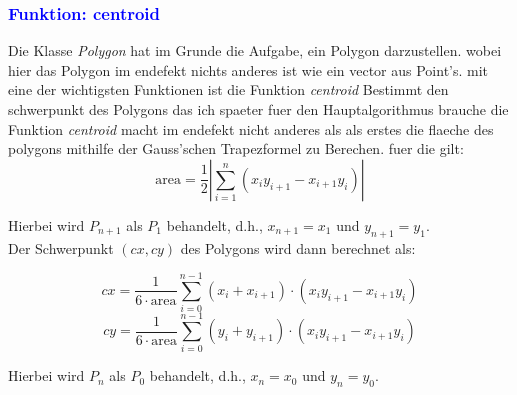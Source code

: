 \documentclass{article}
\begin{document}
\subsubsection{\textcolor{blue}{Funktion: centroid}}
\begin{center}
Die Klasse \textit{Polygon} hat im Grunde die Aufgabe, ein Polygon darzustellen. wobei hier das Polygon im endefekt nichts anderes ist wie ein vector aus Point's. mit eine der wichtigsten Funktionen ist die Funktion \textit{centroid} Bestimmt den schwerpunkt des Polygons das ich spaeter fuer den Hauptalgorithmus brauche die Funktion \textit{centroid} macht im endefekt nicht anderes als als erstes die flaeche des polygons mithilfe der Gauss'schen Trapezformel zu Berechen. fuer die gilt:
\[
\text{area} = \frac{1}{2} \left| \sum_{i=1}^{n} (x_i y_{i+1} - x_{i+1} y_i) \right|
\]

Hierbei wird $P_{n+1}$ als $P_1$ behandelt, d.h., $x_{n+1} = x_1$ und $y_{n+1} = y_1$.
\\
Der Schwerpunkt $(cx, cy)$ des Polygons wird dann berechnet als:

\[
cx = \frac{1}{6 \cdot \text{area}} \sum_{i=0}^{n-1} (x_i + x_{i+1}) \cdot (x_i y_{i+1} - x_{i+1} y_i)
\]
\[
cy = \frac{1}{6 \cdot \text{area}} \sum_{i=0}^{n-1} (y_i + y_{i+1}) \cdot (x_i y_{i+1} - x_{i+1} y_i)
\]

Hierbei wird $P_{n}$ als $P_0$ behandelt, d.h., $x_{n} = x_0$ und $y_{n} = y_0$. 
\end{center}
\end{document}

